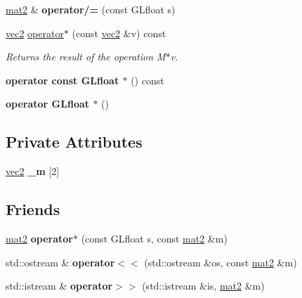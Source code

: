 \begin{DoxyCompactItemize}
\item 
\hypertarget{class_angel_1_1mat2_ad72c91bf3c2d1ea79a0ee67f50b3dda6}{\hyperlink{class_angel_1_1mat2}{mat2} \& {\bfseries operator/=} (const \-G\-Lfloat s)}\label{class_angel_1_1mat2_ad72c91bf3c2d1ea79a0ee67f50b3dda6}

\item 
\hyperlink{struct_angel_1_1vec2}{vec2} \hyperlink{class_angel_1_1mat2_a1be53f556f8dd39cc2a95c0168319129}{operator$\ast$} (const \hyperlink{struct_angel_1_1vec2}{vec2} \&v) const 
\begin{DoxyCompactList}\small\item\em \-Returns the result of the operation \-M$\ast$v. \end{DoxyCompactList}\item 
\hypertarget{class_angel_1_1mat2_a413f7a4b589ff434f6a4f3a2bf2e3238}{{\bfseries operator const G\-Lfloat $\ast$} () const }\label{class_angel_1_1mat2_a413f7a4b589ff434f6a4f3a2bf2e3238}

\item 
\hypertarget{class_angel_1_1mat2_a1964937b0ce62e819edb23c8eeee9ddc}{{\bfseries operator G\-Lfloat $\ast$} ()}\label{class_angel_1_1mat2_a1964937b0ce62e819edb23c8eeee9ddc}

\end{DoxyCompactItemize}
\subsection*{\-Private \-Attributes}
\begin{DoxyCompactItemize}
\item 
\hypertarget{class_angel_1_1mat2_a04ca47b08412fa9c9ed5067843df53e9}{\hyperlink{struct_angel_1_1vec2}{vec2} {\bfseries \-\_\-m} \mbox{[}2\mbox{]}}\label{class_angel_1_1mat2_a04ca47b08412fa9c9ed5067843df53e9}

\end{DoxyCompactItemize}
\subsection*{\-Friends}
\begin{DoxyCompactItemize}
\item 
\hypertarget{class_angel_1_1mat2_a93186aa02a28897515079acad73bd0dd}{\hyperlink{class_angel_1_1mat2}{mat2} {\bfseries operator$\ast$} (const \-G\-Lfloat s, const \hyperlink{class_angel_1_1mat2}{mat2} \&m)}\label{class_angel_1_1mat2_a93186aa02a28897515079acad73bd0dd}

\item 
\hypertarget{class_angel_1_1mat2_a264412852cfa06a39b477d08b390d8e8}{std\-::ostream \& {\bfseries operator$<$$<$} (std\-::ostream \&os, const \hyperlink{class_angel_1_1mat2}{mat2} \&m)}\label{class_angel_1_1mat2_a264412852cfa06a39b477d08b390d8e8}

\item 
\hypertarget{class_angel_1_1mat2_a43f4ce08af11ef35f85de6c785b093a8}{std\-::istream \& {\bfseries operator$>$$>$} (std\-::istream \&is, \hyperlink{class_angel_1_1mat2}{mat2} \&m)}\label{class_angel_1_1mat2_a43f4ce08af11ef35f85de6c785b093a8}

\end{DoxyCompactItemize}


